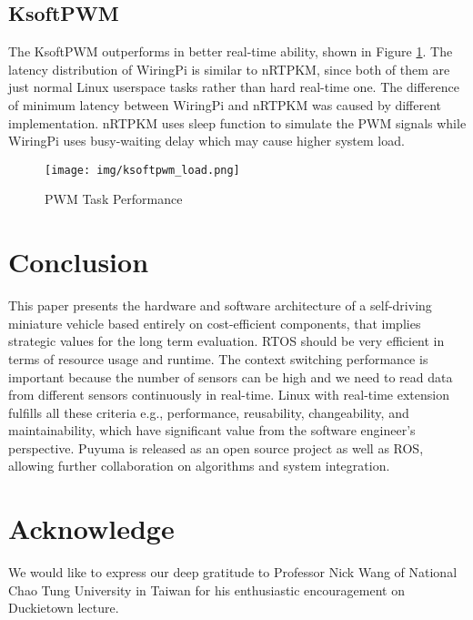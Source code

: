 \documentclass[conference]{IEEEtran}
\begin{document}
\subsection{KsoftPWM}

The KsoftPWM outperforms in better real-time ability, shown in Figure \ref{fig:ksoftpwm_perf}. The latency distribution of WiringPi is similar to nRTPKM, since both of them are just normal Linux userspace tasks rather than hard real-time one. The difference of minimum latency between WiringPi and nRTPKM was caused by different implementation. nRTPKM uses sleep function to simulate the PWM signals while WiringPi uses busy-waiting delay which may cause higher system load.

\begin{figure}
	\centering
	\texttt{[image: img/ksoftpwm\_load.png]}
	\caption{PWM Task Performance}
	\label{fig:ksoftpwm_perf}
\end{figure}

\section{Conclusion}

This paper presents the hardware and software architecture of a self-driving miniature vehicle based entirely on cost-efficient components, that implies strategic values for the long term evaluation. RTOS should be very efficient in terms of resource usage and runtime. The context switching performance is important because the number of sensors can be high and we need to read data from different sensors continuously in real-time. Linux with real-time extension  fulfills all these criteria e.g., performance, reusability, changeability, and maintainability, which have significant value from the software engineer's perspective. Puyuma is released as an open source project as well as ROS, allowing further collaboration on algorithms and system integration.

\section{Acknowledge}

We would like to express our deep gratitude to Professor Nick Wang of National Chao Tung University in Taiwan for his enthusiastic encouragement on Duckietown lecture.



\end{document}
